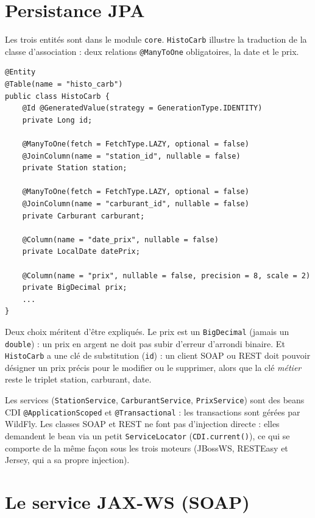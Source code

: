 \documentclass[11pt,a4paper]{article}
\newcommand{\code}[1]{\texttt{#1}}
\begin{document}
\section{Persistance JPA}
Les trois entités sont dans le module \code{core}. \code{HistoCarb} illustre la traduction de la classe d'association : deux relations \code{@ManyToOne} obligatoires, la date et le prix.

\begin{lstlisting}[language=JavaX]
@Entity
@Table(name = "histo_carb")
public class HistoCarb {
    @Id @GeneratedValue(strategy = GenerationType.IDENTITY)
    private Long id;

    @ManyToOne(fetch = FetchType.LAZY, optional = false)
    @JoinColumn(name = "station_id", nullable = false)
    private Station station;

    @ManyToOne(fetch = FetchType.LAZY, optional = false)
    @JoinColumn(name = "carburant_id", nullable = false)
    private Carburant carburant;

    @Column(name = "date_prix", nullable = false)
    private LocalDate datePrix;

    @Column(name = "prix", nullable = false, precision = 8, scale = 2)
    private BigDecimal prix;
    ...
}
\end{lstlisting}

Deux choix méritent d'être expliqués. Le prix est un \code{BigDecimal} (jamais un \code{double}) : un prix en argent ne doit pas subir d'erreur d'arrondi binaire. Et \code{HistoCarb} a une clé de substitution (\code{id}) : un client SOAP ou REST doit pouvoir désigner un prix précis pour le modifier ou le supprimer, alors que la clé \emph{métier} reste le triplet station, carburant, date.

Les services (\code{StationService}, \code{CarburantService}, \code{PrixService}) sont des beans CDI \code{@ApplicationScoped} et \code{@Transactional} : les transactions sont gérées par WildFly. Les classes SOAP et REST ne font pas d'injection directe : elles demandent le bean via un petit \code{ServiceLocator} (\code{CDI.current()}), ce qui se comporte de la même façon sous les trois moteurs (JBossWS, RESTEasy et Jersey, qui a sa propre injection).

\section{Le service JAX-WS (SOAP)}
\end{document}
